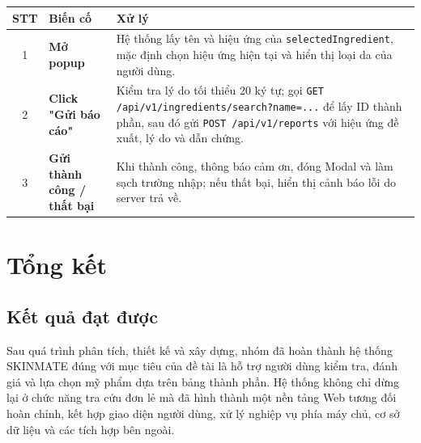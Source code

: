 \documentclass[12pt,a4paper]{article}
\begin{document}
\begin{center}
\renewcommand{\arraystretch}{1.5}
\begin{tabularx}{\textwidth}{|c|l|X|}
\hline
\rowcolor{blue!20}
\textbf{STT} & \textbf{Biến cố} & \textbf{Xử lý} \\ \hline

1 & \textbf{Mở popup} & Hệ thống lấy tên và hiệu ứng của \texttt{selectedIngredient}, mặc định chọn hiệu ứng hiện tại và hiển thị loại da của người dùng. \\ \hline

2 & \textbf{Click "Gửi báo cáo"} & Kiểm tra lý do tối thiểu 20 ký tự; gọi \texttt{GET /api/v1/ingredients/search?name=...} để lấy ID thành phần, sau đó gửi \texttt{POST /api/v1/reports} với hiệu ứng đề xuất, lý do và dẫn chứng. \\ \hline

3 & \textbf{Gửi thành công / thất bại} & Khi thành công, thông báo cảm ơn, đóng Modal và làm sạch trường nhập; nếu thất bại, hiển thị cảnh báo lỗi do server trả về. \\ \hline

\end{tabularx}
\end{center}





\section{Tổng kết}

\subsection{Kết quả đạt được}

Sau quá trình phân tích, thiết kế và xây dựng, nhóm đã hoàn thành hệ thống SKINMATE đúng với mục tiêu của đề tài là hỗ trợ người dùng kiểm tra, đánh giá và lựa chọn mỹ phẩm dựa trên bảng thành phần. Hệ thống không chỉ dừng lại ở chức năng tra cứu đơn lẻ mà đã hình thành một nền tảng Web tương đối hoàn chỉnh, kết hợp giao diện người dùng, xử lý nghiệp vụ phía máy chủ, cơ sở dữ liệu và các tích hợp bên ngoài.
\end{document}
